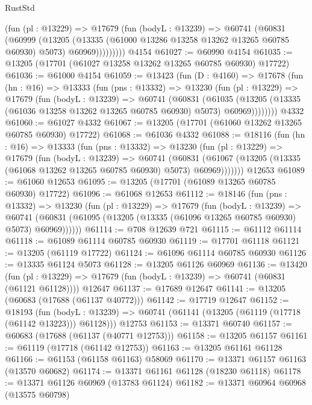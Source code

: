 \begin{lexlean}{RustStd}
\begin{coremodule}
            (fun (pl : @13229) =>
            @17679
              (fun (bodyL : @13239) =>
              @60741
                (@60831
                  (@60999
                    (@13205
                      (@13335 (@61000 @13286 @13258 @13262 @13265 @60785 @60930) @5073)
                      @60969)))))))))
    @4154
@61027 := @60990 @4154
@61035 := @13205 (@17701 (@61027 @13258 @13262 @13265 @60785 @60930) @17722)
@61036 := @61000 @4154
@61059 := @13423
    (fun (D : @4160) =>
    @17678
      (fun (hn : @16) =>
      @13333
        (fun (pns : @13332) =>
        @13230
          (fun (pl : @13229) =>
          @17679
            (fun (bodyL : @13239) =>
            @60741
              (@60831
                (@61035
                  (@13205 (@13335 (@61036 @13258 @13262 @13265 @60785 @60930) @5073) @60969))))))))
    @4332
@61060 := @61027 @4332
@61067 := @13205 (@17701 (@61060 @13262 @13265 @60785 @60930) @17722)
@61068 := @61036 @4332
@61088 := @18116
    (fun (hn : @16) =>
    @13333
      (fun (pns : @13332) =>
      @13230
        (fun (pl : @13229) =>
        @17679
          (fun (bodyL : @13239) =>
          @60741
            (@60831
              (@61067 (@13205 (@13335 (@61068 @13262 @13265 @60785 @60930) @5073) @60969)))))))
    @12653
@61089 := @61060 @12653
@61095 := @13205 (@17701 (@61089 @13265 @60785 @60930) @17722)
@61096 := @61068 @12653
@61112 := @18146
    (fun (pns : @13332) =>
    @13230
      (fun (pl : @13229) =>
      @17679
        (fun (bodyL : @13239) =>
        @60741 (@60831 (@61095 (@13205 (@13335 (@61096 @13265 @60785 @60930) @5073) @60969))))))
@61114 := @708 @12639 @721
@61115 := @61112 @61114
@61118 := @61089 @61114 @60785 @60930
@61119 := @17701 @61118
@61121 := @13205 (@61119 @17722)
@61124 := @61096 @61114 @60785 @60930
@61126 := @13335 @61124 @5073
@61128 := @13205 @61126 @60969
@61136 := @13420
    (fun (pl : @13229) => @17679 (fun (bodyL : @13239) => @60741 (@60831 (@61121 @61128))))
    @12647
@61137 := @17689 @12647
@61141 := @13205 (@60683 (@17688 (@61137 @40772)))
@61142 := @17719 @12647
@61152 := @18193
    (fun (bodyL : @13239) => @60741 (@61141 (@13205 (@61119 (@17718 (@61142 @13223))) @61128)))
    @12753
@61153 := @13371 @60740
@61157 := @60683 (@17688 (@61137 (@40771 @12753)))
@61158 := @13205 @61157
@61161 := @61119 (@17718 (@61142 @12753))
@61163 := @13205 @61161 @61128
@61166 := @61153 (@61158 @61163) @58069
@61170 := @13371 @61157 @61163 (@13570 @60682)
@61174 := @13371 @61161 @61128 (@18230 @61118)
@61178 := @13371 @61126 @60969 (@13783 @61124)
@61182 := @13371 @60964 @60968 (@13575 @60798)

\end{coremodule}
\end{lexlean}

